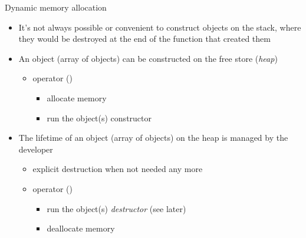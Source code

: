 \begin{frame}{Dynamic memory allocation}

  \begin{itemize}
  \item<1-> It's not always possible or convenient to construct objects on the
    stack, where they would be destroyed at the end of the function that created
    them
  \item<2-> An object (array of objects) can be constructed on the free store
    (\textit{heap})
    \begin{itemize}
    \item operator  ()
      \begin{itemize}
      \item allocate memory
      \item run the object(s) constructor
      \end{itemize}
    \end{itemize}
  \item<3-> The lifetime of an object (array of objects) on the heap is managed
    by the developer
    \begin{itemize}
    \item explicit destruction when not needed any more
    \item operator  ()
      \begin{itemize}
      \item run the object(s) \textit{destructor} (see later)
      \item deallocate memory
      \end{itemize}
    \end{itemize}
  \end{itemize}

\end{frame}

